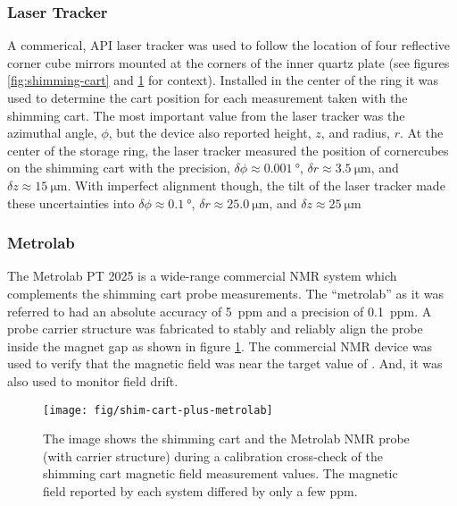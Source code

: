 \subsubsection{Laser Tracker}
A commerical, API laser tracker was used to follow the location of four reflective corner cube mirrors mounted at the corners of the inner quartz plate (see figures \ref{fig:shimming-cart} and \ref{fig:shim-cart-plus-metrolab} for context). Installed in the center of the ring it was used to determine the cart position for each measurement taken with the shimming cart.  The most important value from the laser tracker was the azimuthal angle, $\phi$, but the device also reported height, $z$, and radius, $r$.  At the center of the storage ring, the laser tracker measured the position of cornercubes on the shimming cart with the precision, $\delta\phi \approx \SI{0.001}{\degree}$, $\delta r \approx \SI{3.5}{\micro\meter}$, and $\delta z \approx \SI{15}{\micro\meter}$.  With imperfect alignment though, the tilt of the laser tracker made these uncertainties into $\delta\phi \approx \SI{0.1}{\degree}$, $\delta r \approx \SI{25.0}{\micro\meter}$, and $\delta z \approx \SI{25}{\micro\meter}$

\subsubsection{Metrolab}
The Metrolab PT 2025 is a wide-range commercial NMR system which complements the shimming cart probe measurements.  The ``metrolab'' as it was referred to had an absolute accuracy of \SI{5}{ppm} and a precision of \SI{0.1}{ppm}.  A probe carrier structure was fabricated to stably and reliably align the probe inside the magnet gap as shown in figure \ref{fig:shim-cart-plus-metrolab}.  The commercial NMR device was used to verify that the magnetic field was near the target value of \bmagic.  And, it was also used to monitor field drift.

\begin{figure}
\centering
\texttt{[image: fig/shim-cart-plus-metrolab]}
\caption{
    The image shows the shimming cart and the Metrolab NMR probe (with carrier structure) during a calibration cross-check of the shimming cart magnetic field measurement values.  The magnetic field reported by each system differed by only a few ppm.
    \label{fig:shim-cart-plus-metrolab}
}
\end{figure}

